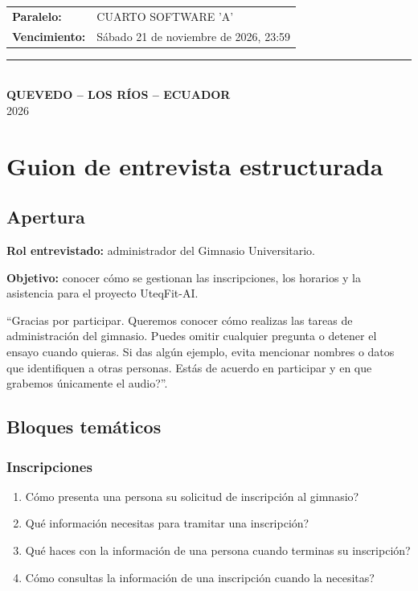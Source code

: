 \documentclass[11pt,a4paper]{article}
\begin{document}
\begin{titlepage}
\begin{minipage}{0.85\textwidth}
\begin{tabular}{@{}>{\bfseries}p{3.2cm}p{9cm}@{}}
				Paralelo: &
				CUARTO SOFTWARE  'A'\\

				Vencimiento: &
				Sábado 21 de noviembre de 2026, 23:59 \\

			\end{tabular}
		\end{minipage}

		\vfill

		{\color{azulTabla}\rule{0.85\textwidth}{0.8pt}}\\[0.4cm]

		{\normalsize\textbf{QUEVEDO -- LOS RÍOS -- ECUADOR}}\\[0.15cm]
		{\normalsize 2026}

	\end{titlepage}

\section{Guion de entrevista estructurada}

\subsection{Apertura}

\textbf{Rol entrevistado:} administrador del Gimnasio Universitario.

\textbf{Objetivo:} conocer cómo se gestionan las inscripciones, los horarios
y la asistencia para el proyecto UteqFit-AI.

``Gracias por participar. Queremos conocer cómo realizas las tareas de
administración del gimnasio. Puedes omitir cualquier pregunta o detener
el ensayo cuando quieras. Si das algún ejemplo, evita mencionar nombres
o datos que identifiquen a otras personas. \textquestiondown{}Estás de acuerdo en participar
y en que grabemos únicamente el audio?''.

\subsection{Bloques temáticos}

\subsubsection*{Inscripciones}

\begin{enumerate}
    \item \textquestiondown{}Cómo presenta una persona su solicitud de inscripción al gimnasio?
    \item \textquestiondown{}Qué información necesitas para tramitar una inscripción?
    \item \textquestiondown{}Qué haces con la información de una persona cuando terminas su inscripción?
    \item \textquestiondown{}Cómo consultas la información de una inscripción cuando la necesitas?
\end{enumerate}
\end{document}
